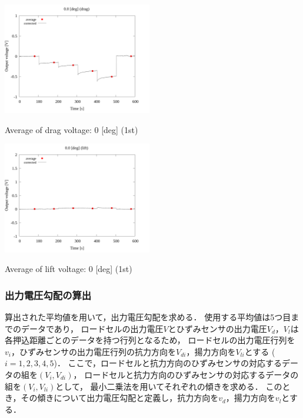 \begin{multicols}{2}
    \begin{figure_here}
        \begin{center}
            \includegraphics[width=65mm]{../../02_workspace/result/2-1/plot/03-2_drag/03_drag_average_0.png}
            \caption{Average of drag voltage: 0 [deg] (1st)}
            \includegraphics[width=65mm]{../../02_workspace/result/2-1/plot/03-3_lift/03_lift_average_0.png}
            \caption{Average of lift voltage: 0 [deg] (1st)}
        \end{center}
    \end{figure_here}
\end{multicols}

\newpage

\subsubsection{出力電圧勾配の算出}

算出された平均値を用いて，出力電圧勾配を求める．
使用する平均値は5つ目までのデータであり，
ロードセルの出力電圧$V$とひずみセンサの出力電圧$V_d$，$V_l$は各押込距離ごとのデータを持つ行列となるため，
ロードセルの出力電圧行列を$v_i$，ひずみセンサの出力電圧行列の抗力方向を$V_{di}$，揚力方向を$V_{li}$とする
($i = 1, 2, 3, 4, 5$)．
ここで，ロードセルと抗力方向のひずみセンサの対応するデータの組を$(V_i,V_{di})$，
ロードセルと抗力方向のひずみセンサの対応するデータの組を$(V_i,V_{li})$として，
最小二乗法を用いてそれぞれの傾きを求める．
このとき，その傾きについて出力電圧勾配と定義し，抗力方向を$v_d$，揚力方向を$v_l$とする．

